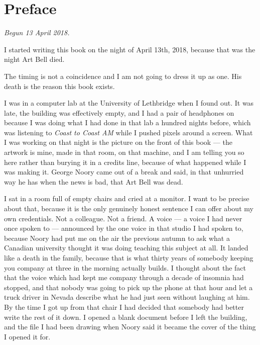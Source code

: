 \cleardoublepage
\chapter*{Preface}

\begin{center}
\begin{minipage}{0.88\textwidth}
\small\itshape\color{steel}
\centering
Begun 13 April 2018.
\end{minipage}
\end{center}
\vspace{10pt}

I started writing this book on the night of April 13th, 2018, because that was
the night Art Bell died.

The timing is not a coincidence and I am not going to dress it up as one. His
death is the reason this book exists.

I was in a computer lab at the University of Lethbridge when I found out. It
was late, the building was effectively empty, and I had a pair of headphones on
because I was doing what I had done in that lab a hundred nights before, which
was listening to \emph{Coast to Coast AM} while I pushed pixels around a
screen. What I was working on that night is the picture on the front of this
book --- the artwork is mine, made in that room, on that machine, and I am
telling you so here rather than burying it in a credits line, because of what
happened while I was making it. George Noory came out of a break and said, in
that unhurried way he has when the news is bad, that Art Bell was dead.

I sat in a room full of empty chairs and cried at a monitor. I want to be
precise about that, because it is the only genuinely honest sentence I can
offer about my own credentials. Not a colleague. Not a friend. A voice --- a
voice I had never once spoken to --- announced by the one voice in that studio
I had spoken to, because Noory had put me on the air the previous autumn to ask
what a Canadian university thought it was doing teaching this subject at all.
It landed like a death in the family, because that is
what thirty years of somebody keeping you company at three in the morning
actually builds. I thought about the fact that the voice which had kept me
company through a decade of insomnia had stopped, and that nobody was going to
pick up the phone at that hour and let a truck driver in Nevada describe what
he had just seen without laughing at him. By the time I got up from that chair
I had decided that somebody had better write the rest of it down. I opened a
blank document before I left the building, and the file I had been drawing when
Noory said it became the cover of the thing I opened it for.

